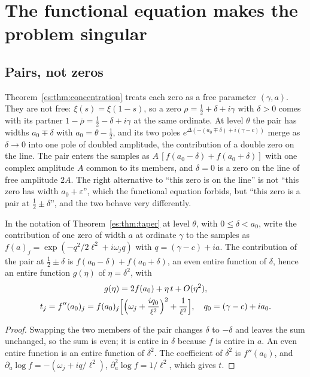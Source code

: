 \section{The functional equation makes the problem singular}\label{es:sec:singular}

\subsection{Pairs, not zeros}

Theorem~\ref{es:thm:concentration} treats each zero as a free parameter $(\gamma,a)$. They are not free: $\xi(s)=\xi(1-s)$, so a zero $\rho=\tfrac12+\delta+i\gamma$ with $\delta>0$ comes with its partner $1-\bar\rho=\tfrac12-\delta+i\gamma$ at the same ordinate. At level $\theta$ the pair has widths $a_0\mp\delta$ with $a_0=\theta-\tfrac12$, and its two poles $e^{\Delta(-(a_0\mp\delta)+i(\gamma-c))}$ merge as $\delta\to0$ into one pole of doubled amplitude, the contribution of a double zero on the line. The pair enters the samples as $A\,[f(a_0-\delta)+f(a_0+\delta)]$ with one complex amplitude $A$ common to its members, and $\delta=0$ is a zero on the line of free amplitude $2A$. The right alternative to ``this zero is on the line'' is not ``this zero has width $a_0+\varepsilon$'', which the functional equation forbids, but ``this zero is a pair at $\tfrac12\pm\delta$'', and the two behave very differently.

\begin{lemma}[evenness]\label{es:lem:even}
In the notation of Theorem~\ref{es:thm:taper} at level $\theta$, with $0\le\delta<a_0$, write the contribution of one zero of width $a$ at ordinate $\gamma$ to the samples as $f(a)_j=\exp(-q^2/2\ell^2+i\omega_jq)$ with $q=(\gamma-c)+ia$. The contribution of the pair at $\tfrac12\pm\delta$ is $f(a_0-\delta)+f(a_0+\delta)$, an even entire function of $\delta$, hence an entire function $g(\eta)$ of $\eta=\delta^2$, with
\[
\begin{gathered}g(\eta)=2f(a_0)+\eta\,t+O(\eta^2),\\ t_j=f''(a_0)_j=f(a_0)_j\Bigl[\Bigl(\omega_j+\frac{iq_0}{\ell^2}\Bigr)^2+\frac1{\ell^2}\Bigr],\quad q_0=(\gamma-c)+ia_0 .\end{gathered}
\]
\end{lemma}

\begin{proof}
Swapping the two members of the pair changes $\delta$ to $-\delta$ and leaves the sum unchanged, so the sum is even; it is entire in $\delta$ because $f$ is entire in $a$. An even entire function is an entire function of $\delta^2$. The coefficient of $\delta^2$ is $f''(a_0)$, and $\partial_a\log f=-(\omega_j+iq/\ell^2)$, $\partial_a^2\log f=1/\ell^2$, which gives $t$.
\end{proof}


